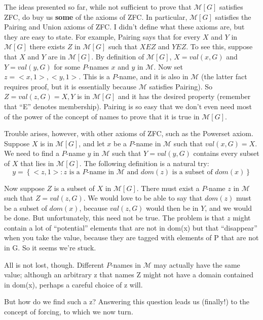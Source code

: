 \documentclass[10pt]{article}
\newcommand\axiom[1]{\textmd{#1}}
\begin{document}
The ideas presented so far, while not sufficient to prove that $\mathcal{M}[G]$ satisfies \axiom{ZFC}, do buy us \textbf{some} of the axioms of \axiom{ZFC}. In particular, $\mathcal{M}[G]$ satisfies the Pairing and Union axioms of \axiom{ZFC}. I didn't define what these axioms are, but they are easy to state. For example, Pairing says that for every $X$ and $Y$ in $\mathcal{M}[G]$ there exists $Z$ in $\mathcal{M}[G]$ such that $X E Z$ and $Y E Z$. To see this, suppose that $X$ and $Y$ are in $\mathcal{M}[G]$. By definition of $\mathcal{M}[G]$, $X = val(x,G)$ and $Y = val(y,G)$ for some $P$-names $x$ and $y$ in $\mathcal M$. Now set $z = {<x,1>, <y,1>}$. This is a $P$-name, and it is also in $\mathcal{M}$ (the latter fact requires proof, but it is essentially because $\mathcal{M}$ satisfies Pairing). So $Z = val(z,G) = {X,Y}$ is in $\mathcal{M}[G]$ and it has the desired property (remember that ``E'' denotes membership). Pairing is so easy that we don't even need most of the power of the concept of names to prove that it is true in $\mathcal{M}[G]$.

Trouble arises, however, with other axioms of \axiom{ZFC}, such as the Powerset axiom. Suppose $X$ is in $\mathcal{M}[G]$, and let $x$ be a $P$-name in $\mathcal{M}$ such that $val(x,G) = X$. We need to find a $P$-name $y$ in $\mathcal{M}$ such that $Y = val(y,G)$ contains every subset of $X$ that lies in $\mathcal{M}[G]$. The following definition is a natural try:
$$y = \left\{<z,1> : z\text{ is a }P\text{-name in }\mathcal{M}\text{ and }dom(z)\text{ is a subset of }dom(x)\right\}$$

Now suppose $Z$ is a subset of $X$ in $\mathcal{M}[G]$. There must exist a $P$-name $z$ in $\mathcal M$ such that $Z = val(z,G)$. We would love to be able to say that $dom(z)$ must be a subset of $dom(x)$, because $val(z,G)$ would then be in $Y$, and we would be done. But unfortunately, this need not be true. The problem is that $z$ might contain a lot of ``potential'' elements that are not in dom(x) but that ``disappear'' when you take the value, because they are tagged with elements of P that are not in G. So it seems we're stuck.

All is not lost, though. Different $P$-names in $\mathcal{M}$ may actually have the same value; although an arbitrary z that names Z might not have a domain contained in dom(x), perhaps a careful choice of z will.

But how do we find such a z? Answering this question leads us (finally!) to the concept of forcing, to which we now turn.
\end{document}
